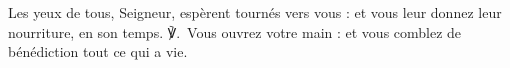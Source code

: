 Les yeux de tous, Seigneur, espèrent tournés vers vous : et vous leur donnez leur nourriture, en son temps.
℣. Vous ouvrez votre main : et vous comblez de bénédiction tout ce qui a vie.
